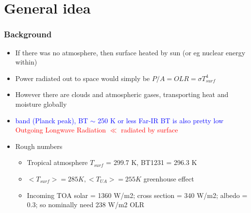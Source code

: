 \documentclass[10pt,t]{beamer}
\begin{document}
\section{General idea}
\begin{frame}
  \frametitle{Background}
  \begin{itemize}
  \item If there was no atmosphere, then surface heated by sun (or eg nuclear energy within)
  \item Power radiated out to space would simply be $P/A = OLR = \sigma T_{surf}^4$ 
  \item However there are clouds and atmospheric gases, transporting heat and moisture globally
  \item \textcolor{blue}{ \um band (Planck peak), BT $\sim$ 250 K or less} \newline
        \textcolor{blue}{\water Far-IR  BT is also pretty low} \newline
        \textcolor{red}{Outgoing Longwave Radiation $\ll$ radiated by surface}  
  \item Rough numbers
    \begin{small}
    \begin{itemize}
    \item Tropical atmosphere $T_{surf}$ = 299.7 K, BT1231 = 296.3 K
    \item $<T_{surf}> = 285 K, <T_{UA}> = 255 K$ greenhouse effect
    \item  Incoming TOA solar = 1360 W/m2; cross section = 340 W/m2; albedo = 0.3;
        so nominally need 238 W/m2 OLR
    \end{itemize}
    \end{small}    
  \end{itemize}
\end{frame}


  
\end{document}
